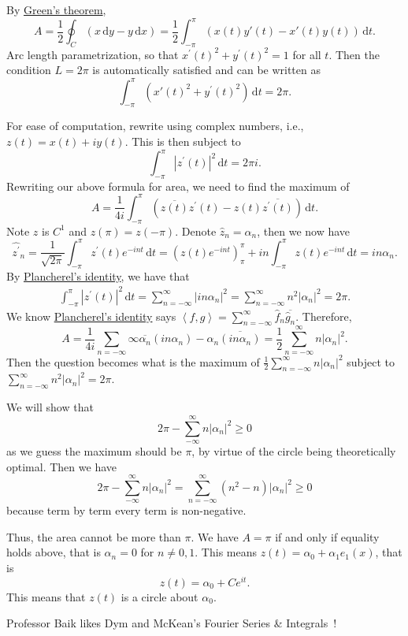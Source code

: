 \begin{explanation}
	By \href{https://en.wikipedia.org/wiki/Green's_theorem}{Green's theorem},
	\[
		A = \frac{1}{2} \oint_C (x \,\mathrm{d}y - y \,\mathrm{d}x) = \frac{1}{2} \int_{-\pi}^\pi (x(t)y'(t) - x'(t)y(t)) \,\mathrm{d}t.
	\]
	Arc length parametrization, so that \(x^\prime (t)^2 + y^\prime (t)^2 = 1\) for all \(t\). Then the condition \(L = 2 \pi\) is automatically satisfied and can be written as
	\[
		\int_{-\pi}^\pi (x'(t)^2 + y^\prime(t)^2) \,\mathrm{d}t = 2\pi.
	\]

	For ease of computation, rewrite using complex numbers, i.e., \(z(t) = x(t) + i y(t)\). This is then subject to
	\[
		\int_{-\pi}^\pi \left\vert z^\prime(t) \right\vert^2 \,\mathrm{d}t = 2 \pi i.
	\]
	Rewriting our above formula for area, we need to find the maximum of
	\[
		A = \frac{1}{4i}\int_{-\pi}^\pi (\overline{z(t)}z^\prime(t) - z(t)\overline{z^\prime(t)}) \,\mathrm{d}t.
	\]
	Note \(z\) is \(C^1\) and \(z(\pi) = z(-\pi)\). Denote \(\hat{z}_n = \alpha_n\), then we now have
	\[
		\widehat{z^\prime}_n
		= \frac{1}{\sqrt{2\pi} } \int_{-\pi}^\pi z^\prime(t) e^{-in t} \,\mathrm{d}t
		= \left(z(t)e^{-i n t}\right)^\pi_\pi + in\int_{-\pi}^\pi z(t) e^{-in t} \,\mathrm{d}t
		= in\alpha_n.
	\]
	By \hyperref[eg:Plancherel-identity]{Plancherel's identity}, we have that
	\begin{align*}
		\int_{-\pi}^\pi \left\vert z^\prime (t) \right\vert ^2 \,\mathrm{d}t
		= \sum_{n=-\infty}^\infty \left\vert in\alpha_n \right\vert ^2
		= \sum_{n=-\infty}^\infty n^2 \left\vert \alpha_n \right\vert ^2 = 2\pi.
	\end{align*}
	We know \hyperref[eg:Plancherel-identity]{Plancherel's identity} says \(\left< f,g \right> = \sum_{n=-\infty}^\infty \hat{f}_n\overline{\hat{g}_n}\). Therefore,
	\[
		A = \frac{1}{4i} \sum_{n=-\infty}\infty \overline{\alpha_n}(in\alpha_n) - \alpha_n\overline{(in\alpha_n)}
		= \frac{1}{2} \sum_{n=-\infty}^\infty n \left\vert \alpha_n \right\vert ^2.
	\]
	Then the question becomes what is the maximum of \(\frac{1}{2}\sum_{n=-\infty}^\infty n\left\vert \alpha_n \right\vert^2\) subject to \(\sum_{n=-\infty}^\infty n^2\left\vert \alpha_n \right\vert^2 = 2\pi\).

	We will show that
	\[
		2 \pi - \sum_{-\infty}^\infty n\left\vert \alpha_n \right\vert^2 \geq 0
	\]
	as we guess the maximum should be \(\pi\), by virtue of the circle being theoretically optimal. Then we have
	\[
		2 \pi - \sum_{-\infty}^\infty n\left\vert \alpha_n \right\vert^2 = \sum_{n=-\infty}^\infty (n^2-n)\left\vert \alpha_n \right\vert^2 \geq 0
	\]
	because term by term every term is non-negative.

	Thus, the area cannot be more than \(\pi\). We have \(A = \pi\) if and only if equality holds above, that is \(\alpha_n = 0\) for \(n \neq 0,1\). This means \(z(t) = \alpha_0 + \alpha_1 e_1(x)\), that is
	\[
		z(t) = \alpha_0 + Ce^{it}.
	\]
	This means that \(z(t)\) is a circle about \(\alpha_0\).
\end{explanation}

\begin{note}
	Professor Baik likes Dym and McKean's Fourier Series \& Integrals~\cite{dym1972fourier}!
\end{note}
